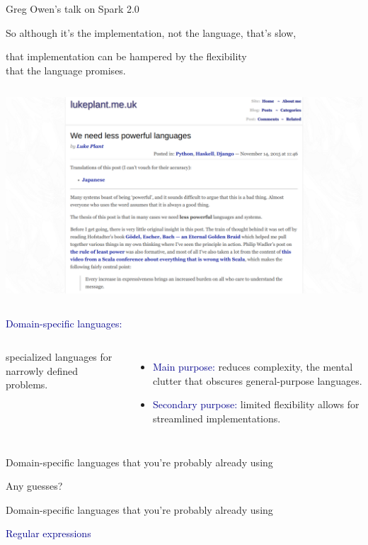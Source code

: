 \documentclass[aspectratio=169]{beamer}
\begin{document}
\begin{frame}{Greg Owen's talk on Spark 2.0}
\vspace{0.17 cm}
\begin{center}
\end{center}
\end{frame}

\begin{frame}{}
\Large
\vspace{1 cm}
\begin{center}
So although it's the implementation, not the language, that's slow,

\vspace{1 cm}
that implementation can be hampered by the flexibility \\ that the language promises.
\end{center}
\end{frame}

\begin{frame}{}
\begin{columns}[t]
\includegraphics[width=\linewidth]{less-powerful.png}
\end{columns}
\end{frame}

\begin{frame}{}
\LARGE
\vspace{1.25 cm}
\textcolor{darkblue}{Domain-specific languages:}

\vspace{0.5 cm}
\Large
\begin{columns}
specialized languages for narrowly defined problems.

\large
\vspace{0.5 cm}
\begin{itemize}\setlength{\itemsep}{0.5 cm}
\item \textcolor{darkblue}{Main purpose:} reduces complexity, the mental clutter that obscures general-purpose languages.
\item \textcolor{darkblue}{Secondary purpose:} limited flexibility allows for streamlined implementations.
\end{itemize}
\end{columns}
\end{frame}

\begin{frame}{Domain-specific languages that you're probably already using}
\huge
\vspace{1 cm}
\begin{center}
Any guesses?
\end{center}
\end{frame}

\begin{frame}{Domain-specific languages that you're probably already using}
\LARGE
\vspace{0.25 cm}

\textcolor{darkblue}{Regular expressions}

\begin{center}
\end{center}
\end{frame}
\end{document}
